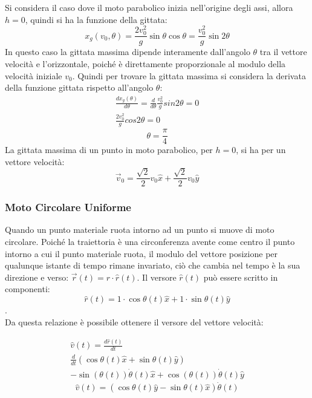 \documentclass{article}
\numberwithin{equation}{subsection}
\begin{document}
Si considera il caso dove il moto parabolico inizia nell'origine 
degli assi, allora $h=0$, quindi si ha la funzione della gittata:
\begin{equation}
    x_g(v_0,\theta)=\displaystyle\frac{2v_0^2}{g}\sin\theta \cos\theta=\frac{v_0^2}{g}\sin2\theta
\end{equation}
In questo caso la gittata massima dipende interamente dall'angolo 
$\theta$ tra il vettore velocità e l'orizzontale, poiché è direttamente proporzionale al modulo della velocità iniziale $v_0$. Quindi
per trovare la gittata massima si considera la derivata della funzione gittata rispetto all'angolo $\theta$: 
\begin{gather*}
    \displaystyle\frac{dx_g(\theta)}{d\theta}=\frac{d}{d\theta}\frac{v_0^2}{g}sin2\theta=0\\
    \displaystyle\frac{2v_0^2}{g}cos2\theta=0
\end{gather*}
\begin{equation}
    \theta=\displaystyle\frac{\pi}{4}
\end{equation}
La gittata massima di un punto in moto parabolico, per $h=0$, 
si ha per un vettore velocità:
\begin{equation} 
    \vec{v}_0=\displaystyle\frac{\sqrt{2}}{2}v_0\hat{x}+\frac{\sqrt{2}}{2}v_0\hat{y}
\end{equation}

\subsubsection{Moto Circolare Uniforme}

Quando un punto materiale ruota intorno ad un punto si muove di moto circolare.
Poiché la traiettoria è una circonferenza avente come centro il 
punto intorno a cui il punto materiale ruota, il modulo del vettore posizione 
per qualunque istante di tempo rimane invariato, ciò che cambia nel tempo è 
la sua direzione e verso: $\vec{r}(t)=r\cdot\hat{r}(t)$.
Il versore $\hat{r}(t)$ può essere scritto in componenti: 
\begin{equation}
    \hat{r}(t)=1\cdot \cos\theta(t)\hat{x}+1\cdot \sin\theta(t)\hat{y}
\end{equation}.
\\
Da questa relazione è possibile ottenere il versore del 
vettore velocità: 

\begin{gather*}
    \hat{v}(t)=\displaystyle\frac{d\hat{r}(t)}{dt}\\
    \displaystyle\frac{d}{dt}\left(\cos\theta(t)\hat{x}+\sin\theta(t)\hat{y}\right)\\
    -\sin(\theta(t))\dot\theta(t)\hat{x}+\cos(\theta(t))\dot\theta(t)\hat{y}
\end{gather*}
\begin{equation}
    \hat{v}(t)=\left(\cos\theta(t)\hat{y}-\sin\theta(t)\hat{x}\right)\dot\theta(t)
\end{equation}
\end{document}
